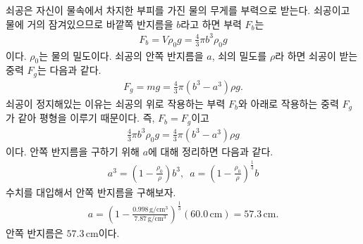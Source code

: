 \documentclass[floatfix,nofootinbib,superscriptaddress,fleqn]{revtex4-2}
\begin{document}
쇠공은 자신이 물속에서 차지한 부피를 가진 물의 무게를 부력으로 받는다.
쇠공이고 물에 거의 잠겨있으므로 바깥쪽 반지름을 $b$라고 하면 
부력 $F_b$는
\begin{align}
  F_b = V\rho_0 g =\frac{4}{3}\pi b^3\rho_0 g
\end{align}
이다. $\rho_0$는 물의 밀도이다. 
쇠공의 안쪽 반지름을 $a$, 쇠의 밀도를 $\rho$라 하면 쇠공이 받는 중력 $F_g$는
다음과 같다.
\begin{align}
  F_g = mg = \frac{4}{3}\pi(b^3-a^3)\rho g.
\end{align}
쇠공이 정지해있는 이유는
쇠공의 위로 작용하는 부력 $F_b$와 아래로 작용하는 중력 $F_g$가 같아 
평형을 이루기 때문이다. 즉, $F_b = F_g$이고
\begin{align}
  \frac{4}{3}\pi b^3\rho_0 g = \frac{4}{3}\pi(b^3-a^3)\rho g
\end{align}
이다. 안쪽 반지름을 구하기 위해 $a$에 대해 정리하면 다음과 같다.
\begin{align}
  a^3 = \left(1-\frac{\rho_0}{\rho}\right)b^3,\,\,\,
  a = {\left(1-\frac{\rho_0}{\rho}\right)}^{\frac{1}{3}}b
\end{align}
수치를 대입해서 안쪽 반지름을 구해보자.
\begin{align}
  a = {\left(1-\frac{0.998\,\mathrm{g/cm^3}}
  {7.87\,\mathrm{g/cm^3}}\right)}^{\frac{1}{3}}
  (60.0\,\mathrm{cm})= 57.3\,\mathrm{cm}.
\end{align}
안쪽 반지름은 $57.3\,\mathrm{cm}$이다.
\end{document}
